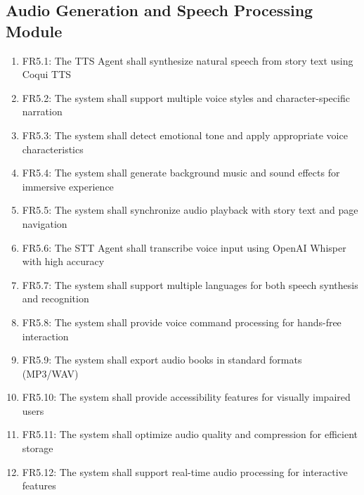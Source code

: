 \subsection{Audio Generation and Speech Processing Module}
\begin{enumerate}
    \item FR5.1: The TTS Agent shall synthesize natural speech from story text using Coqui TTS
    \item FR5.2: The system shall support multiple voice styles and character-specific narration
    \item FR5.3: The system shall detect emotional tone and apply appropriate voice characteristics
    \item FR5.4: The system shall generate background music and sound effects for immersive experience
    \item FR5.5: The system shall synchronize audio playback with story text and page navigation
    \item FR5.6: The STT Agent shall transcribe voice input using OpenAI Whisper with high accuracy
    \item FR5.7: The system shall support multiple languages for both speech synthesis and recognition
    \item FR5.8: The system shall provide voice command processing for hands-free interaction
    \item FR5.9: The system shall export audio books in standard formats (MP3/WAV)
    \item FR5.10: The system shall provide accessibility features for visually impaired users
    \item FR5.11: The system shall optimize audio quality and compression for efficient storage
    \item FR5.12: The system shall support real-time audio processing for interactive features
\end{enumerate}

